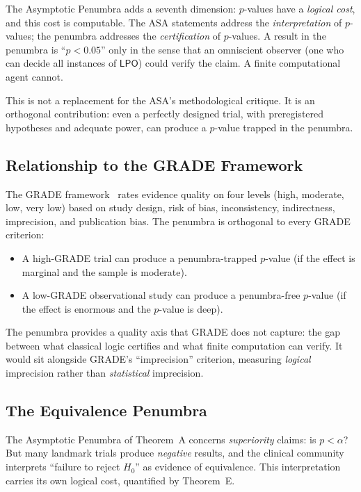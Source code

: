 \documentclass[11pt,a4paper]{article}
\theoremstyle{plain}
\theoremstyle{definition}
\newcommand{\LPO}{\textsf{LPO}}
\begin{document}
The Asymptotic Penumbra adds a seventh dimension: $p$-values have a \emph{logical cost}, and this cost is computable.  The ASA statements address the \emph{interpretation} of $p$-values; the penumbra addresses the \emph{certification} of $p$-values.  A result in the penumbra is ``$p < 0.05$'' only in the sense that an omniscient observer (one who can decide all instances of $\LPO$) could verify the claim.  A finite computational agent cannot.

This is not a replacement for the ASA's methodological critique.  It is an orthogonal contribution: even a perfectly designed trial, with preregistered hypotheses and adequate power, can produce a $p$-value trapped in the penumbra.

\subsection{Relationship to the GRADE Framework}

The GRADE framework~\cite{grade} rates evidence quality on four levels (high, moderate, low, very low) based on study design, risk of bias, inconsistency, indirectness, imprecision, and publication bias.  The penumbra is orthogonal to every GRADE criterion:

\begin{itemize}[nosep]
\item A high-GRADE trial can produce a penumbra-trapped $p$-value (if the effect is marginal and the sample is moderate).
\item A low-GRADE observational study can produce a penumbra-free $p$-value (if the effect is enormous and the $p$-value is deep).
\end{itemize}

The penumbra provides a quality axis that GRADE does not capture: the gap between what classical logic certifies and what finite computation can verify.  It would sit alongside GRADE's ``imprecision'' criterion, measuring \emph{logical} imprecision rather than \emph{statistical} imprecision.

\subsection{The Equivalence Penumbra}

The Asymptotic Penumbra of Theorem~A concerns \emph{superiority} claims: is $p < \alpha$?  But many landmark trials produce \emph{negative} results, and the clinical community interprets ``failure to reject $H_0$'' as evidence of equivalence.  This interpretation carries its own logical cost, quantified by Theorem~E.
\end{document}
